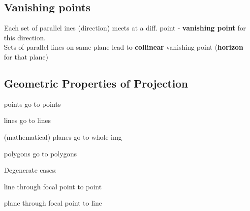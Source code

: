 \documentclass{article}
\begin{document}
\subsection{Vanishing points}
Each set of parallel ines (direction) meets at a diff. point - \textbf{vanishing point}
for this direction.
\\
Sets of parallel lines on same plane lead to \textbf{collinear} vanishing point (\textbf{horizon} for that plane)

\subsection{Geometric Properties of Projection}
\begin{list}{-}{}
    \item points go to points
    \item lines go to lines
    \item (mathematical) planes go to whole img
    \item polygons go to polygons
\end{list}
Degenerate cases:
\begin{list}{-}{}
    \item line through focal point to point
    \item plane through focal point to line
\end{list}
\end{document}
